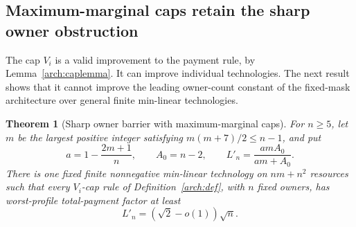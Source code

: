 \documentclass[11pt]{article}
\newtheorem{theorem}{Theorem}[section]
\theoremstyle{definition}\newtheorem{definition}[theorem]{Definition}
\theoremstyle{remark}\newtheorem{remark}[theorem]{Remark}
\begin{document}
\subsection{Maximum-marginal caps retain the sharp owner obstruction}

The cap $V_i$ is a valid improvement to the payment rule, by
Lemma~\ref{arch:caplemma}. It can improve individual technologies. The next
result shows that it cannot improve the leading owner-count constant of the
fixed-mask architecture over general finite min-linear technologies.

\begin{theorem}[Sharp owner barrier with maximum-marginal caps]
\label{arch:vowner}
For $n\ge5$, let $m$ be the largest positive integer satisfying
$m(m+7)/2\le n-1$, and put
\[
 a=1-\frac{2m+1}{n},\qquad A_0=n-2,
 \qquad L'_n=\frac{amA_0}{am+A_0}.
\]
There is one fixed finite nonnegative min-linear technology on
$nm+n^2$ resources such that every $V_i$-cap rule of
Definition~\ref{arch:def}, with $n$ fixed owners, has worst-profile
total-payment factor at least
\begin{equation}\label{arch:vownerfactor}
 L'_n=(\sqrt2-o(1))\sqrt n.
\end{equation}
\end{theorem}
\end{document}
